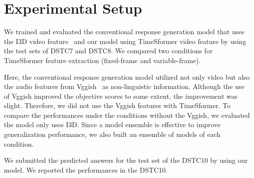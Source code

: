 \documentclass[letterpaper]{article} %
\begin{document}
\section{Experimental Setup}
We trained and evaluated the conventional response generation model that uses the I3D video feature~\cite{Li2021bridging} and our model using TimeSformer video feature by using the test sets of DSTC7 and DSTC8.
We compared two conditions for TimeSformer feature extraction (fixed-frame and variable-frame).

Here, the conventional response generation model utilized not only video but also the audio features from Vggish~\cite{Hershey2017cnn} as non-linguistic information.
%
Although the use of Vggish improved the objective scores to some extent, the improvement was slight.
Therefore, we did not use the Vggish features with TimeSformer.
To compare the performances under the conditions without the Vggish, we evaluated the model only uses I3D.
%
Since a model ensemble is effective to improve generalization performance, we also built an ensemble of models of each condition.

We submitted the predicted answers for the test set of the DSTC10 by using our model.
We reported the performances in the DSTC10.
\end{document}
